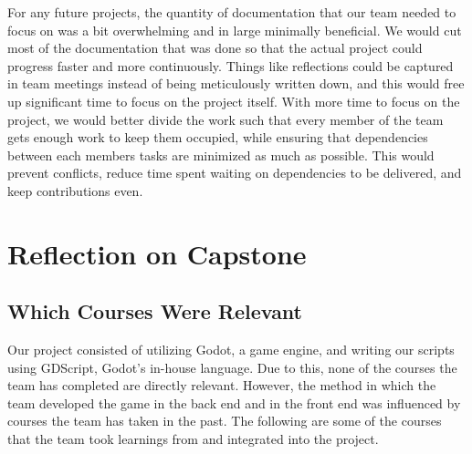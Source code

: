 \documentclass{article}
\begin{document}
For any future projects, the quantity of documentation that our team needed to focus on was a bit overwhelming and in large minimally beneficial. We would cut most of the documentation that was done so that the actual project could progress faster and more continuously. Things like reflections could be captured in team meetings instead of being meticulously written down, and this would free up significant time to focus on the project itself. With more time to focus on the project, we would better divide the work such that every member of the team gets enough work to keep them occupied, while ensuring that dependencies between each members tasks are minimized as much as possible. This would prevent conflicts, reduce time spent waiting on dependencies to be delivered, and keep contributions even.

\section{Reflection on Capstone}

\subsection{Which Courses Were Relevant}

Our project consisted of utilizing Godot, a game engine, and writing our scripts using GDScript, Godot's in-house language. Due to this, none of the courses the team has completed are directly relevant. However, the method in which the team developed the game in the back end and in the front end was influenced by courses the team has taken in the past. The following are some of the courses that the team took learnings from and integrated into the project. 
\end{document}

